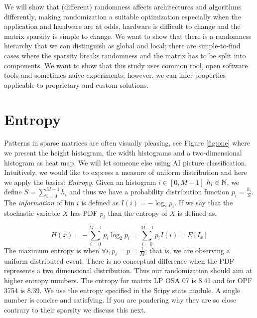 \documentclass[manuscript,screen]{acmart}
\begin{document}
We will show that (different) randomness affects architectures and
algorithms differently, making randomization a suitable optimization
especially when the application and hardware are at odds, hardware is
difficult to change and the matrix sparsity is simple to change. We
want to show that there is a randomness hierarchy that we can
distinguish as global and local; there are simple-to-find cases where
the sparsity breaks randomness and the matrix has to be split into
components.  We want to show that this study uses common tool, open
software tools and sometimes naive experiments; however, we can infer
properties applicable to proprietary and custom solutions.

\newpage 
{}

\section{Entropy}
\label{sec:entropy}
Patterns in sparse matrices are often visually pleasing, see Figure
\ref{fig:one} where we present the height histogram, the width
histograms and a two-dimensional histogram as heat map. We will let
someone else using AI picture classification. Intuitively, we would
like to express a measure of uniform distribution and here we apply
the basics: {\em Entropy}. Given an histogram $i\in[0,M-1]$ $h_i \in
\mathbb{N}$, we define $S =\sum_{i=0}^{M-1}h_i$ and thus we have a probability
distribution function $p_i = \frac{h_i}{S}$. The {\em information} of
bin $i$ is defined as $I(i) = -\log_2 p_i$. If we say that the
stochastic variable $X$ has PDF $p_i$ than the entropy of $X$ is
defined as.

\begin{equation}
  \label{eq:entropy}
  H(x) = -\sum_{i=0}^{M-1} p_i\log_2p_i = \sum_{i=0}^{M-1}p_i I(i) =
  E[I_x]
\end{equation}
The maximum entropy is when $\forall i, p_i = p = \frac{1}{M}$; that
is, we are observing a uniform distributed event. There is no
conceptual difference when the PDF represents a two dimensional
distribution. Thus our randomization should aim at higher entropy
numbers. The entropy for matrix LP OSA 07 is 8.41 and for OPF 3754 is
8.39. We use the entropy specified in the Scipy stats module.  A
single number is concise and satisfying. If you are pondering why they
are so close contrary to their sparsity we discuss this next.
\end{document}
